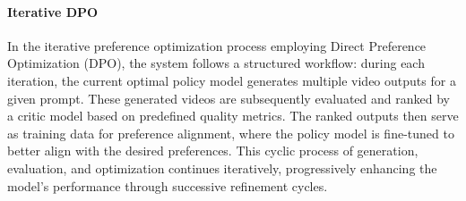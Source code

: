 \paragraph{Iterative DPO} In the iterative preference optimization process employing Direct Preference Optimization (DPO), the system follows a structured workflow: during each iteration, the current optimal policy model generates multiple video outputs for a given prompt. These generated videos are subsequently evaluated and ranked by a critic model based on predefined quality metrics. The ranked outputs then serve as training data for preference alignment, where the policy model is fine-tuned to better align with the desired preferences. This cyclic process of generation, evaluation, and optimization continues iteratively, progressively enhancing the model's performance through successive refinement cycles.
